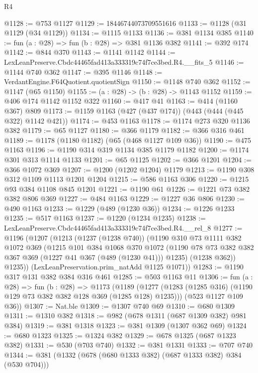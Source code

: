 \begin{lexlean}{R4}
\begin{coremodule}
@1128 := @753 @1127
@1129 := 18446744073709551616
@1133 := @1128 (@31 @1129 (@34 @1129))
@1134 := @1115 @1133
@1136 := @381 @1134 @385
@1140 := fun (a : @28) => fun (b : @28) => @381 @1136 @382
@1141 := @392 @174
@1142 := @844 @370
@1143 := @1141 @1142
@1144 := LexLeanPreserve.Cbdc44465fad413a333319c74f7ce3bed.R4.__fits_5
@1146 := @1144 @740 @362
@1147 := @395 @1146
@1148 := VerdantEngine.F64Quotient.quotientSign
@1150 := @1148 @740 @362
@1152 := @1147 (@65 @1150)
@1155 := (a : @28) -> (b : @28) -> @1143 @1152
@1159 := @406 @174 @1142 @1152 @322
@1160 := @417 @41
@1163 := @414 (@1160 @367) @809
@1173 := @1159 @1163 (@427 (@437 @174)) (@443 (@444 (@445 @322) @1142 @421))
@1174 := @453 @1163
@1178 := @1174 @273 @320 @1136 @382
@1179 := @65 @1127
@1180 := @366 @1179
@1182 := @366 @316 @461
@1189 := @1178 (@1180 @1182) (@65 (@468 @1127 @109 @36))
@1190 := @475 @1163
@1196 := @1190 @314 @319 @1134 @385 @1179 @1182
@1200 := @1174 @301 @313 @1114 @1133
@1201 := @65 @1125
@1202 := @366 @1201
@1204 := @366 @1072 @369
@1207 := @1200 (@1202 @1204) @1179
@1213 := @1190 @308 @312 @1109 @1113 @1201 @1204
@1215 := @586 @1163 @306
@1220 := @1215 @93 @384 @1108 @845 @1201
@1221 := @1190 @61
@1226 := @1221 @73 @382 @382 @806 @369
@1227 := @484 @1163
@1229 := @1227 @36 @806
@1230 := @490 @1163
@1233 := @1229 (@489 (@1230 @36))
@1234 := @1226 @1233
@1235 := @517 @1163
@1237 := @1220 (@1234 @1235)
@1238 := LexLeanPreserve.Cbdc44465fad413a333319c74f7ce3bed.R4.__rel_8
@1277 := @1196
    (@1207
      (@1213
        (@1237 (@1238 @740))
        (@1190
          @310
          @73
          @1111
          @382
          @1072
          @369
          (@1215
            @101
            @384
            @1068
            @370
            @1072
            (@1190 @78 @73 @382 @382 @367 @369 (@1227 @41 @367 (@489 (@1230 @41))) @1235)
            (@1238 @362))
          @1235))
      (LexLeanPreservation.prim_natAdd @1125 @1071))
@1283 := @1190 @317 @131 @382 @384 @316 @461
@1285 := @503 @1163 @11
@1306 := fun (a : @28) =>
  fun (b : @28) =>
  @1173
    (@1189
      (@1277 (@1283 (@1285 @316) (@1190 @129 @73 @382 @382 @128 @369 (@1285 @128) @1235)))
      (@523 @1127 @109 @36))
@1307 := Nat.ble
@1309 := @1307 @740 @69
@1310 := @680 @1309
@1311 := @1310 @382
@1318 := @982 (@678 @1311 (@687 @1309 @382) @981 @384)
@1319 := @381 @1318
@1323 := @381 @1309 (@1307 @362 @69)
@1324 := @680 @1323
@1325 := @1324 @382
@1329 := @678 @1325 (@687 @1323 @382)
@1331 := @530 (@703 @740)
@1332 := @381 @1331
@1333 := @707 @740
@1344 := @381 (@1332 (@678 (@680 @1333 @382) (@687 @1333 @382) @384 (@530 @704)))

\end{coremodule}
\end{lexlean}
